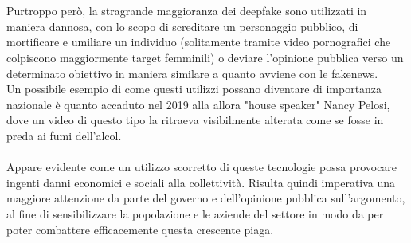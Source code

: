 \documentclass[12pt, a4paper]{article}
\begin{document}
\\\\
Purtroppo però, la stragrande maggioranza dei deepfake sono utilizzati in maniera dannosa, con lo scopo di screditare un personaggio pubblico, di mortificare e umiliare un individuo (solitamente tramite video pornografici che colpiscono maggiormente target femminili) o deviare l'opinione pubblica verso un determinato obiettivo in maniera similare a quanto avviene con le fakenews.
\\
Un possibile esempio di come questi utilizzi possano diventare di importanza nazionale è quanto accaduto nel 2019 alla allora "house speaker" Nancy Pelosi, dove un video di questo tipo la ritraeva visibilmente alterata come se fosse in preda ai fumi dell'alcol\cite{FakeVideoNancyPelosi}.
\\\\%
Appare evidente come un utilizzo scorretto di queste tecnologie possa provocare ingenti danni economici e sociali alla collettività. Risulta quindi imperativa una maggiore attenzione da parte del governo e dell'opinione pubblica sull'argomento, al fine di sensibilizzare la popolazione e le aziende del settore in modo da per poter combattere efficacemente questa crescente piaga.



\newpage
\end{document}
